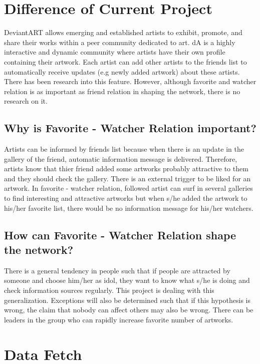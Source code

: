 \documentclass[12pt,a4paper]{report}
\begin{document}
\chapter{Difference of Current Project} 

	DeviantART allows emerging and established artists to exhibit, promote, and share their works within a peer community dedicated to art. dA is a highly interactive and dynamic community where artists have their own profile containing their artwork. Each artist can add other artists to the friends list to automatically receive updates (e.g newly added artwork) about these artists. There has been research into this feature. However, although favorite and watcher relation is as important as friend relation in shaping the network, there is no research on it. 

\section{Why is Favorite - Watcher Relation important?}

	Artists can be informed by friends list because when there is an update in the gallery of the friend, automatic information message is delivered. Therefore, artists know that thier friend added some artworks probably attractive to them and they should check the gallery. There is an external trigger to be liked for an artwork. In favorite - watcher relation, followed artist can surf in several galleries to find interesting and attractive artworks but when s/he added the artwork to his/her favorite list, there would be no information message for his/her watchers. 

\section{How can Favorite - Watcher Relation shape the network?} 

	There is a general tendency in people such that if people are attracted by someone and choose him/her as idol, they want to know what s/he is doing and check information sources regularly. This project is dealing with this generalization. Exceptions will also be determined such that if this hypothesis is wrong, the claim that nobody can affect others may also be wrong. There can be leaders in the group who can rapidly increase favorite number of artworks.

\chapter{Data Fetch}
\end{document}
